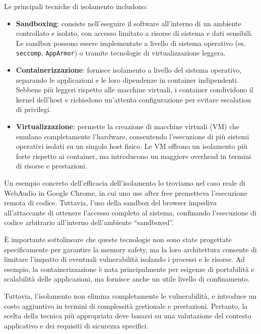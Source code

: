 Le principali tecniche di isolamento includono:
\begin{itemize}
  \item \textbf{Sandboxing}: consiste nell'eseguire il software all'interno di un
    ambiente controllato e isolato, con accesso limitato a risorse di sistema e
    dati sensibili. Le sandbox possono essere implementate a livello di sistema operativo
    (es. \texttt{seccomp}, \texttt{AppArmor}) o tramite tecnologie di virtualizzazione
    leggera.

  \item \textbf{Containerizzazione}: fornisce isolamento a livello del sistema operativo,
    separando le applicazioni e le loro dipendenze in container indipendenti. Sebbene
    più leggeri rispetto alle macchine virtuali, i container condividono il
    kernel dell'host e richiedono un'attenta configurazione per evitare
    escalation di privilegi.

  \item \textbf{Virtualizzazione}: permette la creazione di macchine virtuali (VM)
    che emulano completamente l'hardware, consentendo l'esecuzione di più
    sistemi operativi isolati su un singolo host fisico. Le VM offrono un isolamento
    più forte rispetto ai container, ma introducono un maggiore overhead in
    termini di risorse e prestazioni.
\end{itemize}

Un esempio concreto dell'efficacia dell'isolamento lo troviamo nel caso reale di
WebAudio in Google Chrome, in cui uno use after free premetteva l'esecuzione
remota di codice. Tuttavia, l'uso della sandbox del browser impediva all'attaccante
di ottenere l'accesso completo al sistema, confinando l'esecuzione di codice arbitrario
all'interno dell'ambiente ``sandboxed''.\cite{webaudio_uaf}

È importante sottolineare che queste tecnologie non sono state progettate
specificamente per garantire la memory safety, ma la loro architettura consente di
limitare l'impatto di eventuali vulnerabilità isolando i processi e le risorse.
Ad esempio, la containerizzazione è nata principalmente per esigenze di portabilità
e scalabilità delle applicazioni, ma fornisce anche un utile livello di
confinamento.

Tuttavia, l'isolamento non elimina completamente le vulnerabilità, e introduce
un costo aggiuntivo in termini di complessità gestionale e prestazioni. Pertanto,
la scelta della tecnica più appropriata deve basarsi su una valutazione del
contesto applicativo e dei requisiti di sicurezza specifici.